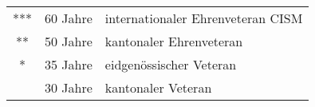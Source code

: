 \begin{history}
    \unvbox\veteranenbox
\end{history}

\begin{tabular}{ c l l  }
    *** & 60 Jahre & internationaler Ehrenveteran CISM \\
    **  & 50 Jahre & kantonaler Ehrenveteran           \\
    *   & 35 Jahre & eidgenössischer Veteran           \\
        & 30 Jahre & kantonaler Veteran                \\
\end{tabular}
